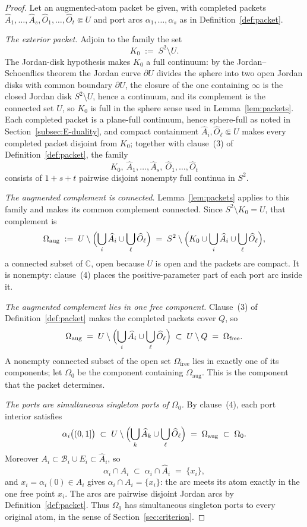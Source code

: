 \documentclass[11pt,reqno]{amsart}
\theoremstyle{definition}
\theoremstyle{remark}
\newcommand{\C}{\mathbb C}
\newcommand{\Omfree}{\Omega_{\mathrm{free}}}
\begin{document}
\begin{proof}
Let an augmented-atom packet be given, with completed packets
$\widehat A_1,\dots,\widehat A_s,\widehat O_1,\dots,\widehat O_t\Subset U$ and port
arcs $\alpha_1,\dots,\alpha_s$ as in Definition~\ref{def:packet}.

\emph{The exterior packet.}
Adjoin to the family the set
\[
K_0\;:=\;S^2\setminus U .
\]
The Jordan-disk hypothesis makes $K_0$ a full continuum: by the Jordan--Schoenflies
theorem the Jordan curve $\partial U$ divides the sphere into two open Jordan disks
with common boundary $\partial U$, the closure of the one containing $\infty$ is the
closed Jordan disk $S^2\setminus U$, hence a continuum, and its complement is the
connected set $U$, so $K_0$ is full in the sphere sense used in
Lemma~\ref{lem:packets}. Each completed packet is a plane-full continuum, hence
sphere-full as noted in Section~\ref{subsec:E-duality}, and compact containment
$\widehat A_i,\widehat O_\ell\Subset U$ makes every completed packet disjoint from
$K_0$; together with clause~(3) of Definition~\ref{def:packet}, the family
\[
K_0,\ \widehat A_1,\dots,\widehat A_s,\ \widehat O_1,\dots,\widehat O_t
\]
consists of $1+s+t$ pairwise disjoint nonempty full continua in $S^2$.

\emph{The augmented complement is connected.}
Lemma~\ref{lem:packets} applies to this family and makes its common complement
connected. Since $S^2\setminus K_0=U$, that complement is
\begin{equation}\label{eq:E-omega-aug}
\Omega_{\mathrm{aug}}\;:=\;
U\setminus\Bigl(\bigcup_{i}\widehat A_i\cup\bigcup_{\ell}\widehat O_\ell\Bigr)
\;=\;S^2\setminus\Bigl(K_0\cup\bigcup_i\widehat A_i\cup
\bigcup_\ell\widehat O_\ell\Bigr),
\end{equation}
a connected subset of $\C$, open because $U$ is open and the packets are compact. It
is nonempty: clause~(4) places the positive-parameter part of each port arc inside
it.

\emph{The augmented complement lies in one free component.}
Clause~(3) of Definition~\ref{def:packet} makes the completed packets cover $Q$, so
\[
\Omega_{\mathrm{aug}}
\;=\;U\setminus\Bigl(\bigcup_i\widehat A_i\cup\bigcup_\ell\widehat O_\ell\Bigr)
\;\subset\;U\setminus Q\;=\;\Omfree .
\]
A nonempty connected subset of the open set $\Omfree$ lies in exactly one of its
components; let $\Omega_0$ be the component containing $\Omega_{\mathrm{aug}}$. This
is the component that the packet determines.

\emph{The ports are simultaneous singleton ports of $\Omega_0$.}
By clause~(4), each port interior satisfies
\[
\alpha_i\bigl((0,1]\bigr)\;\subset\;
U\setminus\Bigl(\bigcup_k\widehat A_k\cup\bigcup_\ell\widehat O_\ell\Bigr)
\;=\;\Omega_{\mathrm{aug}}\;\subset\;\Omega_0 .
\]
Moreover $A_i\subset\mathcal B_i\cup E_i\subset\widehat A_i$, so
\[
\alpha_i\cap A_i\;\subset\;\alpha_i\cap\widehat A_i\;=\;\{x_i\},
\]
and $x_i=\alpha_i(0)\in A_i$ gives $\alpha_i\cap A_i=\{x_i\}$: the arc meets its atom
exactly in the one free point $x_i$. The arcs are pairwise disjoint Jordan arcs by
Definition~\ref{def:packet}. Thus $\Omega_0$ has simultaneous singleton ports to
every original atom, in the sense of Section~\ref{sec:criterion}.


\end{proof}
\end{document}
